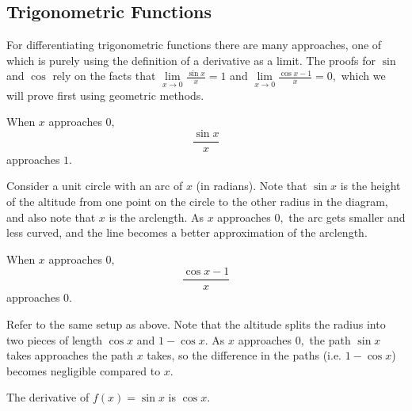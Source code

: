 \documentclass[blue,onecol]{shooting}
\begin{document}
\subsection{Trigonometric Functions}

For differentiating trigonometric functions there are many approaches, one of which is purely using the definition of a derivative as a limit. The proofs for $\sin$ and $\cos$ rely on the facts that $\lim\limits_{x\to 0}\frac{\sin x}{x}=1$ and $\lim\limits_{x\to 0}\frac{\cos x-1}{x}=0,$ which we will prove first using geometric methods.

\begin{theo}
When $x$ approaches $0,$
\[\frac{\sin x}{x}\]
approaches $1.$
\end{theo}

\begin{pro}
Consider a unit circle with an arc of $x$ (in radians). Note that $\sin x$ is the height of the altitude from one point on the circle to the other radius in the diagram, and also note that $x$ is the arclength. As $x$ approaches $0,$ the arc gets smaller and less curved, and the line becomes a better approximation of the arclength.

\begin{center}
\end{center}
\end{pro}

\begin{theo}
When $x$ approaches $0,$
\[\frac{\cos x-1}{x}\]
approaches $0.$
\end{theo}

\begin{pro}
Refer to the same setup as above. Note that the altitude splits the radius into two pieces of length $\cos x$ and $1-\cos x.$ As $x$ approaches $0,$ the path $\sin x$ takes approaches the path $x$ takes, so the difference in the paths (i.e. $1-\cos x$) becomes negligible compared to $x.$
\end{pro}

\begin{theo}
The derivative of $f(x) = \sin x$ is $\cos x.$
\end{theo}
\end{document}

